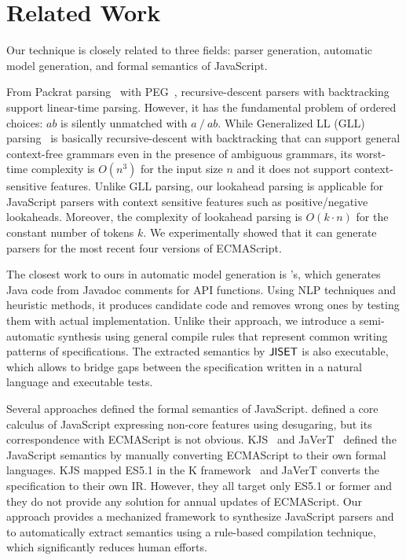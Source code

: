 \section{Related Work}\label{sec:related}
Our technique is closely related to three fields: parser generation,
automatic model generation, and formal semantics of JavaScript.

From Packrat parsing~\cite{packrat} with PEG~\cite{peg}, recursive-descent
parsers with backtracking support linear-time parsing.  However, it
has the fundamental problem of ordered choices: \( ab \) is silently
unmatched with \( a ~/~ ab \).  While Generalized LL (GLL) parsing~\cite{gll}
is basically recursive-descent with backtracking that can support general
context-free grammars even in the presence of ambiguous grammars,
its worst-time complexity is \( O(n^3) \) for the input size \( n \) and it
does not support context-sensitive features.  Unlike GLL parsing, our lookahead
parsing is applicable for JavaScript parsers with context sensitive features
such as positive/negative lookaheads. Moreover, the complexity of lookahead
parsing is \( O(k \cdot n) \) for the constant
number of tokens \( k \). We experimentally showed that it can generate parsers
for the most recent four versions of ECMAScript.

The closest work to ours in automatic model generation
is \citet{javadoc}'s, which generates Java code from Javadoc comments
for API functions.  Using NLP techniques and heuristic methods,
it produces candidate code and removes wrong ones
by testing them with actual implementation. Unlike their approach, we
introduce a semi-automatic synthesis using general compile rules that
represent common writing patterns of specifications.  The extracted
semantics by \(\text{\sf JISET}\) is also executable, which allows to bridge gaps
between the specification written in a natural language and executable
tests.

Several approaches defined the formal semantics of JavaScript.
\citet{lambdajs} defined a core calculus of JavaScript expressing non-core
features using desugaring, but its correspondence with ECMAScript is
not obvious.
KJS~\cite{kjs} and JaVerT~\cite{javert} defined the JavaScript semantics
by manually converting ECMAScript to their own formal languages.  KJS mapped
ES5.1 in the K framework~\cite{kframework} and JaVerT converts the
specification to their own IR.  However, they all target only ES5.1 or former and
they do not provide any solution for annual updates of ECMAScript. Our approach
provides a mechanized framework to synthesize JavaScript parsers and to
automatically extract semantics using a rule-based compilation technique, which
significantly reduces human efforts.

